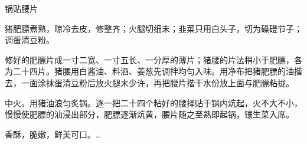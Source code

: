 \begin{recipe}{锅贴腰片}

\ingredients


\cooking

\step 猪肥膘煮熟，晾冷去皮，修整齐；火腿切细末；韭菜只用白头子，切为磉磴节子；调蛋清豆粉。

\step 修好的肥膘片成一寸二宽、一寸五长、一分厚的薄片；猪腰的片法稍小于肥膘，各为二十四片。猪腰用白酱油、料酒、姜葱先调拌均匀入味。用净布把猪肥膘的油揩去，一面涂抹蛋清豆粉后放火腿末少许，再把腰片揩干水份放上面与肥膘粘拢。

\step 中火。用猪油浪匀炙锅。逐一把二十四个粘好的腰择贴于锅内炕起，火不大不小，慢慢使肥膘的汕浸出部分，肥膘逐渐炕黄，腰片随之至熟即起锅，镶生菜入席。

\notes

香酥，脆嫩，鲜美可口。…

\end{recipe}

